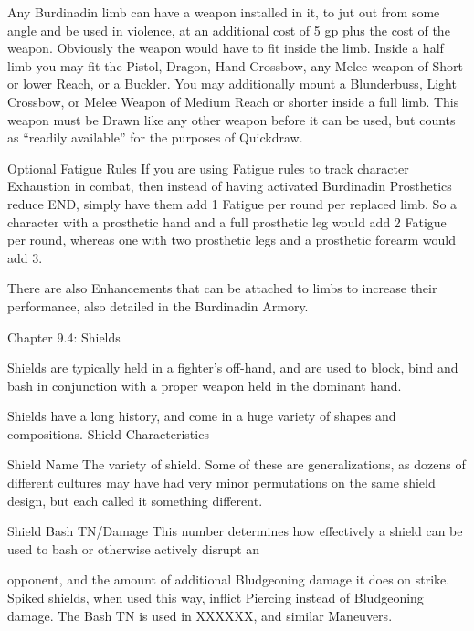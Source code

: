 \documentclass[oneside,11pt,english]{book}
\begin{document}
 

Any Burdinadin limb can have a weapon installed in it, to jut out from some angle and be used in 
violence, at an additional cost of 5 gp plus the cost of the weapon. Obviously the weapon would have to 
fit inside the limb. Inside a half limb you may fit the Pistol, Dragon, Hand Crossbow, any Melee weapon 
of Short or lower Reach, or a Buckler. You may additionally mount a Blunderbuss, Light Crossbow, or 
Melee Weapon of Medium Reach or shorter inside a full limb. This weapon must be Drawn like any other 
weapon before it can be used, but counts as “readily available” for the purposes of Quickdraw. 

 

Optional Fatigue Rules 
If you are using Fatigue rules to track character Exhaustion in combat, then instead of having activated 
Burdinadin Prosthetics reduce END, simply have them add 1 Fatigue per round per replaced limb. So a 
character with a prosthetic hand and a full prosthetic leg would add 2 Fatigue per round, whereas one with 
two prosthetic legs and a prosthetic forearm would add 3. 

 

There are also Enhancements that can be attached to limbs to increase their performance, also detailed in 
the Burdinadin Armory. 
 
Chapter 9.4: Shields 

 

 

Shields are typically held in a fighter’s off-hand, and are used to block, bind and bash in conjunction with 
a proper weapon held in the dominant hand. 

 

Shields have a long history, and come in a huge variety of shapes and compositions. 
Shield Characteristics 

 

Shield Name 
The variety of shield. Some of these are generalizations, as dozens of different cultures may have had 
very minor permutations on the same shield design, but each called it something different. 

 

Shield Bash TN/Damage 
This number determines how effectively a shield can be used to bash or otherwise actively disrupt an 


opponent, and the amount of additional Bludgeoning damage it does on strike. Spiked shields, when used 
this way, inflict Piercing instead of Bludgeoning damage. The Bash TN is used in XXXXXX, and similar 
Maneuvers. 
\end{document}
